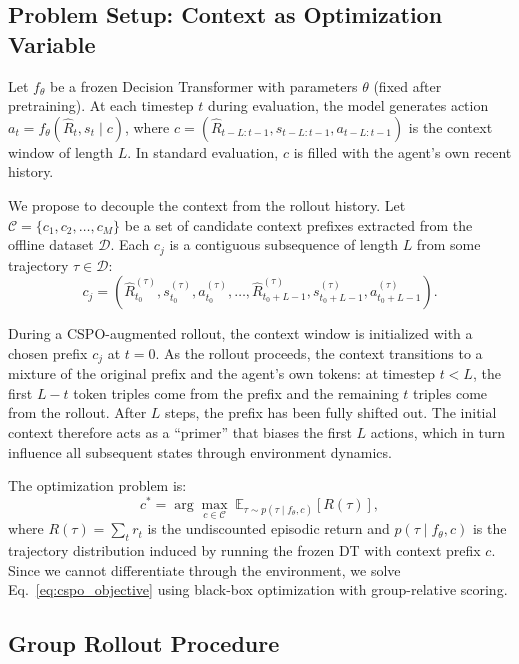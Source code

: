 \documentclass{article}
\newcommand{\cspo}{\textsc{CSPO}}
\newcommand{\EE}{\mathbb{E}}
\newcommand{\cC}{\mathcal{C}}
\newcommand{\cD}{\mathcal{D}}
\begin{document}
\subsection{Problem Setup: Context as Optimization Variable}
\label{sec:method_setup}

Let $f_\theta$ be a frozen Decision Transformer with parameters $\theta$ (fixed after pretraining). At each timestep $t$ during evaluation, the model generates action $a_t = f_\theta(\hat{R}_t, s_t \mid c)$, where $c = (\hat{R}_{t-L:t-1}, s_{t-L:t-1}, a_{t-L:t-1})$ is the context window of length $L$. In standard evaluation, $c$ is filled with the agent's own recent history.

We propose to decouple the context from the rollout history. Let $\cC = \{c_1, c_2, \ldots, c_M\}$ be a set of candidate context prefixes extracted from the offline dataset $\cD$. Each $c_j$ is a contiguous subsequence of length $L$ from some trajectory $\tau \in \cD$:
\begin{equation}
    c_j = (\hat{R}_{t_0}^{(\tau)}, s_{t_0}^{(\tau)}, a_{t_0}^{(\tau)}, \ldots, \hat{R}_{t_0+L-1}^{(\tau)}, s_{t_0+L-1}^{(\tau)}, a_{t_0+L-1}^{(\tau)}).
\end{equation}

During a \cspo{}-augmented rollout, the context window is initialized with a chosen prefix $c_j$ at $t=0$. As the rollout proceeds, the context transitions to a mixture of the original prefix and the agent's own tokens: at timestep $t < L$, the first $L - t$ token triples come from the prefix and the remaining $t$ triples come from the rollout. After $L$ steps, the prefix has been fully shifted out. The initial context therefore acts as a ``primer'' that biases the first $L$ actions, which in turn influence all subsequent states through environment dynamics.

The optimization problem is:
\begin{equation}
    \label{eq:cspo_objective}
    c^* = \arg\max_{c \in \cC} \; \EE_{\tau \sim p(\tau \mid f_\theta, c)} \left[ R(\tau) \right],
\end{equation}
where $R(\tau) = \sum_t r_t$ is the undiscounted episodic return and $p(\tau \mid f_\theta, c)$ is the trajectory distribution induced by running the frozen DT with context prefix $c$. Since we cannot differentiate through the environment, we solve Eq.~\eqref{eq:cspo_objective} using black-box optimization with group-relative scoring.

\subsection{Group Rollout Procedure}
\label{sec:method_rollout}
\end{document}
